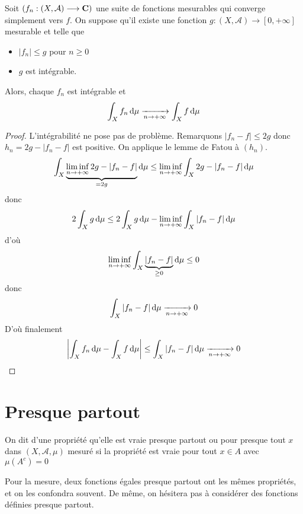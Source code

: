 \begin{thm}
    Soit $(f_n:(X, \mathcal  A)\longrightarrow \mathbf C)$ une suite de fonctions mesurables qui converge simplement vers $f$. On suppose qu'il existe une fonction  $g:(X, \mathcal  A)\longrightarrow [0, +\infty]$ mesurable et telle que \begin{itemize}
        \item $|f_n|\leq g$ pour $n\geq 0$
        \item $g$ est intégrable.
    \end{itemize}
    Alors, chaque $f_n$ est intégrable et \[\int_Xf_n\mathop{}\!\mathrm d\mu \xrightarrow[n\to+\infty]{}\int_Xf\mathop{}\!\mathrm d\mu\]
\end{thm}

\begin{proof}
    L'intégrabilité ne pose pas de problème. Remarquons  $|f_n-f|\leq 2g$ donc $h_n=2g-|f_n-f|$ est positive. On applique le lemme de Fatou à  $(h_n)$. \[
        \int_X\underbrace{\liminf_{n\to +\infty}2g-|f_n-f|}_{=2g}\mathop{}\!\mathrm d\mu\leq \liminf_{n\to +\infty}\int_X2g-|f_n-f|\mathop{}\!\mathrm d\mu
    \]
    donc \[
        2\int_Xg\mathop{}\!\mathrm d\mu\leq 2\int_Xg\mathop{}\!\mathrm d\mu -\liminf_{n\to +\infty}\int_X |f_n-f|\mathop{}\!\mathrm d\mu
    \] 
    d'où \[
        \liminf_{n\to +\infty} \int_X\underbrace{|f_n-f|}_{\geq 0}\mathop{}\!\mathrm d\mu \leq 0
    \] 
    donc \[\int_X|f_n-f|\mathop{}\!\mathrm d\mu \xrightarrow[n\to+\infty]{}0\]
    D'où finalement \[
        \left| \int_Xf_n\mathop{}\!\mathrm d\mu-\int_Xf\mathop{}\!\mathrm d\mu \right|\leq \int_X |f_n-f|\mathop{}\!\mathrm d\mu \xrightarrow[n\to+\infty]{}0
    \] 
\end{proof}

\section{Presque partout}

\begin{dfn}
    On dit d'une propriété qu'elle est vraie presque partout ou pour presque tout $x$ dans  $(X, \mathcal  A, \mu)$ mesuré si la propriété est vraie pour tout $x \in  A$ avec $\mu(A^c)=0$
\end{dfn}

\begin{rem}
Pour la mesure, deux fonctions égales presque partout ont les mêmes propriétés, et on les confondra souvent. De même, on hésitera pas à considérer des fonctions définies presque partout.
\end{rem}

